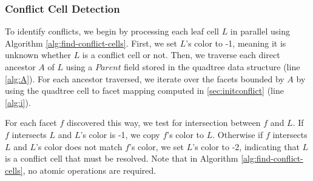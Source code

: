\documentclass[final,3p,times,twocolumn]{elsarticle}
\begin{document}
\subsubsection{Conflict Cell Detection}
\label{sec:detectconflict}
To identify conflicts, we begin by processing each leaf cell $L$ in parallel using Algorithm \ref{alg:find-conflict-cells}. First, we set $L$'s color to -1, meaning it is unknown whether $L$ is a conflict cell or not. Then, we traverse each direct ancestor $A$ of $L$ using a $Parent$ field stored in the quadtree data structure (line \ref{alg:A}). For each ancestor traversed, we iterate over the facets bounded by $A$ by using the quadtree cell to facet mapping computed in \ref{sec:initconflict} (line \ref{alg:i}).

For each facet $f$ discovered this way, we test for intersection between $f$ and $L$. If $f$ intersects $L$ and $L$'s color is -1, we copy $f$'s color to $L$. Otherwise if $f$ intersects $L$ and $L$'s color does not match $f$'s color, we set $L$'s color to -2, indicating that $L$ is a conflict cell that must be resolved. Note that in Algorithm \ref{alg:find-conflict-cells}, no atomic operations are required.



\end{document}
